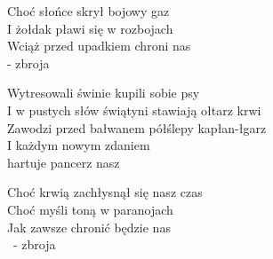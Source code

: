\begin{text}
    \vin Choć słońce skrył bojowy gaz\\
    \vin I żołdak pławi się w rozbojach\\
    \vin Wciąż przed upadkiem chroni nas\\
	\vin - zbroja

    Wytresowali świnie kupili sobie psy\\
    I w pustych słów świątyni stawiają ołtarz krwi\\
    Zawodzi przed bałwanem półślepy kapłan-łgarz\\
    I każdym nowym zdaniem\\
	hartuje pancerz nasz

    \vin Choć krwią zachłysnął się nasz czas\\
    \vin Choć myśli toną w paranojach\\
    \vin Jak zawsze chronić będzie nas\\\
	\vin - zbroja

\end{text}

